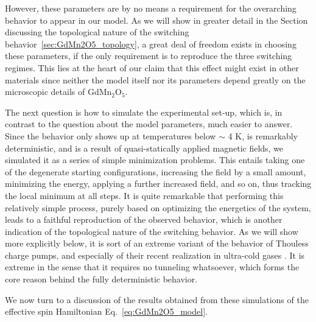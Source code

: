 However, these parameters are by no means a requirement for the overarching behavior to appear in our model. As we will show in greater detail in the Section discussing the topological nature of the switching behavior~\ref{sec:GdMn2O5_topology}, a great deal of freedom exists in choosing these parameters, if the only requirement is to reproduce the three switching regimes.
This lies at the heart of our claim that this effect might exist in other materials since neither the model itself nor its parameters depend greatly on the microscopic details of GdMn$_2$O$_5$. 

The next question is how to simulate the experimental set-up, which is, in contrast to the question about the model parameters, much easier to answer.
Since the behavior only shows up at temperatures below $\sim$ 4 K, is remarkably deterministic, and is a result of quasi-statically applied magnetic fields, we simulated it as a series of simple minimization problems.
This entails taking one of the degenerate starting configurations, increasing the field by a small amount, minimizing the energy, applying a further increased field, and so on, thus tracking the local minimum at all steps.
It is quite remarkable that performing this relatively simple process, purely based on optimizing the energetics of the system, leads to a faithful reproduction of the observed behavior, which is another indication of the topological nature of the switching behavior.
As we will show more explicitly below, it is sort of an extreme variant of the behavior of Thouless charge pumps, and especially of their recent realization in ultra-cold gases \cite{Rice82,Thouless1982,Thouless83,Lohse16,Nakajima16, Atala13}.
It is extreme in the sense that it requires no tunneling whatsoever, which forms the core reason behind the fully deterministic behavior.


We now turn to a discussion of the results obtained from these simulations of the effective spin Hamiltonian Eq.~\eqref{eq:GdMn2O5_model}.

